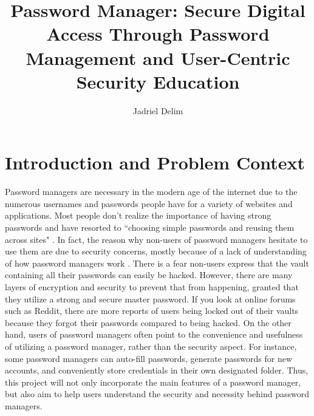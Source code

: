 \documentclass[10pt,twocolumn]{article}
\title{Password Manager: Secure Digital Access Through Password Management and User-Centric Security Education}
\author{Jadriel Delim}
\affiliation{Occidental College}
\begin{document}
\maketitle


\section{Introduction and Problem Context}
Password managers are necessary in the modern age of the internet due to the numerous usernames and passwords people have for a variety of websites and applications. Most people don't realize the importance of having strong passwords and have resorted to ``choosing simple passwords and reusing them across sites" \cite{li2014emperor}. In fact, the reason why non-users of password managers hesitate to use them are due to security concerns, mostly because of a lack of understanding of how password managers work \cite{fagan_albayram_khan_buck_2017}. There is a fear non-users express that the vault containing all their passwords can easily be hacked. However, there are many layers of encryption and security to prevent that from happening, granted that they utilize a strong and secure master password. If you look at online forums such as Reddit, there are more reports of users being locked out of their vaults because they forgot their passwords compared to being hacked. On the other hand, users of password managers often point to the convenience and usefulness of utilizing a password manager, rather than the security aspect\cite{fagan_albayram_khan_buck_2017}. For instance, some password managers can auto-fill passwords, generate passwords for new accounts, and conveniently store credentials in their own designated folder. Thus, this project will not only incorporate the main features of a password manager, but also aim to help users understand the security and necessity behind password managers.
\end{document}
